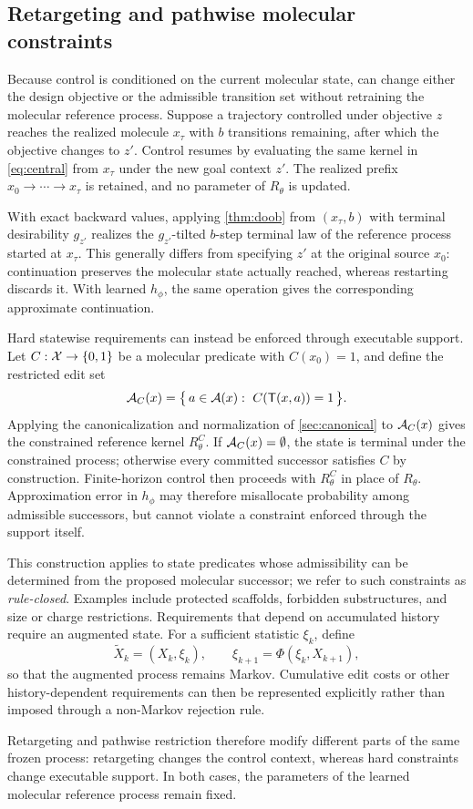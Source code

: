 \subsection{Retargeting and pathwise molecular constraints}
\label{sec:retarget}
\label{sec:pathwise-control}

Because control is conditioned on the current molecular state, \method{} can change either the design objective or the admissible transition set without retraining the molecular reference process. Suppose a trajectory controlled under objective $z$ reaches the realized molecule $x_\tau$ with $b$ transitions remaining, after which the objective changes to $z'$. Control resumes by evaluating the same kernel in \cref{eq:central} from $x_\tau$ under the new goal context $z'$. The realized prefix $x_0\rightarrow\cdots\rightarrow x_\tau$ is retained, and no parameter of $R_\theta$ is updated.

\begin{corollary}
\label{cor:retarget-control}
With exact backward values, applying \cref{thm:doob} from $(x_\tau,b)$ with terminal desirability $g_{z'}$ realizes the $g_{z'}$-tilted $b$-step terminal law of the reference process started at $x_\tau$. This generally differs from specifying $z'$ at the original source $x_0$: continuation preserves the molecular state actually reached, whereas restarting discards it. With learned $h_\phi$, the same operation gives the corresponding approximate continuation.
\end{corollary}

Hard statewise requirements can instead be enforced through executable support. Let $C:\mathcal{X}\to\{0,1\}$ be a molecular predicate with $C(x_0)=1$, and define the restricted edit set
\begin{equation}
\A_C(x)=\bigl\{\,a\in\A(x):\ C(\T(x,a))=1\,\bigr\}.
\label{eq:constrained}
\end{equation}
Applying the canonicalization and normalization of \cref{sec:canonical} to $\mathcal{A}_C(x)$ gives the constrained reference kernel $R^{C}_\theta$. If $\mathcal{A}_C(x)=\emptyset$, the state is terminal under the constrained process; otherwise every committed successor satisfies $C$ by construction. Finite-horizon control then proceeds with $R^{C}_\theta$ in place of $R_\theta$. Approximation error in $h_\phi$ may therefore misallocate probability among admissible successors, but cannot violate a constraint enforced through the support itself.

This construction applies to state predicates whose admissibility can be determined from the proposed molecular successor; we refer to such constraints as \emph{rule-closed}. Examples include protected scaffolds, forbidden substructures, and size or charge restrictions. Requirements that depend on accumulated history require an augmented state. For a sufficient statistic $\xi_k$, define
\[
\widetilde X_k=(X_k,\xi_k),\qquad \xi_{k+1}=\Phi(\xi_k,X_{k+1}),
\]
so that the augmented process remains Markov. Cumulative edit costs or other history-dependent requirements can then be represented explicitly rather than imposed through a non-Markov rejection rule.

Retargeting and pathwise restriction therefore modify different parts of the same frozen process: retargeting changes the control context, whereas hard constraints change executable support. In both cases, the parameters of the learned molecular reference process remain fixed.
